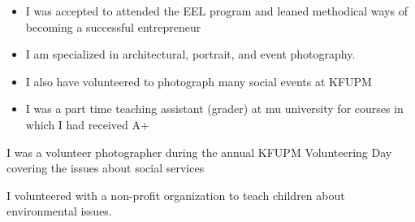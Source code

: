 \documentclass[10pt,a4paper]{altacv}
\begin{document}
\divider

\begin{itemize}
\item I was accepted to attended the EEL program and leaned methodical ways of becoming  a successful entrepreneur
\end{itemize}

\divider

\begin{itemize}
\item I am specialized in architectural, portrait, and event photography.
\item I also have volunteered to photograph many social events at KFUPM
\end{itemize}

\divider

\begin{itemize}
\item I was a part time teaching assistant (grader) at mu university for courses in which I had received A+ 
\end{itemize}



I was a volunteer photographer during the annual KFUPM Volunteering Day covering the issues about social services 

\divider

I volunteered with a non-profit organization to teach children about environmental issues.


\medskip






\end{document}
